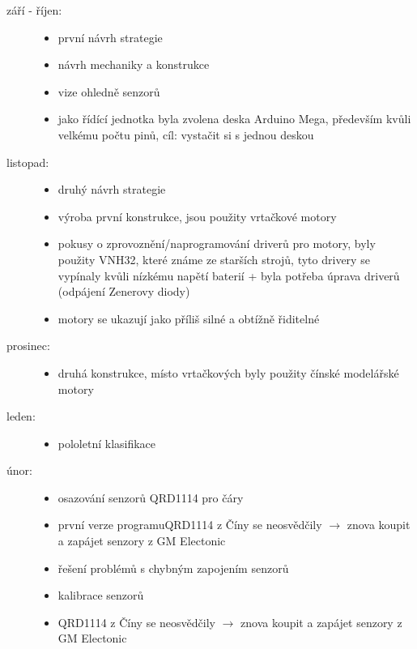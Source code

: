 \begin{description}
	\item[září - říjen:] 
	
	\begin{itemize}
		\item první návrh strategie
		\item návrh mechaniky a konstrukce
		\item  vize ohledně senzorů
		\item jako řídící jednotka byla zvolena deska Arduino Mega, především kvůli velkému počtu pinů, cíl: vystačit si s jednou deskou  
		
	\end{itemize} 
	
	\item[listopad:] 
	
	\begin{itemize}
		\item druhý návrh strategie
		\item výroba první konstrukce, jsou použity vrtačkové motory
		\item pokusy o zprovoznění/naprogramování driverů pro motory, byly použity VNH32, které známe ze starších strojů, 
		tyto drivery se vypínaly kvůli nízkému napětí baterií + byla potřeba úprava driverů (odpájení Zenerovy diody)  
		\item motory se ukazují jako příliš silné a obtížně řiditelné 
	\end{itemize}
	
	\item[prosinec:]
	\begin{itemize}
		\item druhá konstrukce, místo vrtačkových byly použity čínské modelářské motory
	\end{itemize} 
	
	\item[leden:]
	\begin{itemize}
		\item  pololetní klasifikace
	\end{itemize}  
	
	\item[únor:] 
	\begin{itemize}
		\item osazování senzorů QRD1114 pro čáry
		\item první verze programuQRD1114 z Číny se neosvědčily $\rightarrow$ znova koupit a zapájet senzory z GM Electonic
		
		\item řešení problémů s chybným zapojením senzorů 
		\item kalibrace senzorů 
		\item QRD1114 z Číny se neosvědčily $\rightarrow$ znova koupit a zapájet senzory z GM Electonic		
	\end{itemize} 
	

\end{description}
